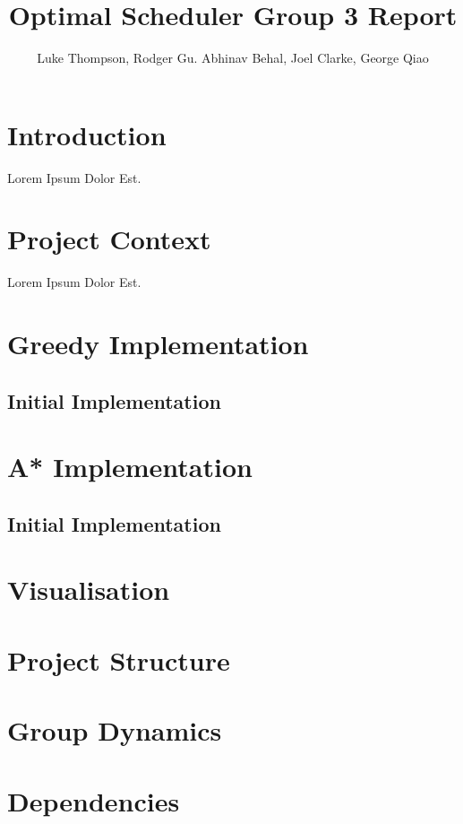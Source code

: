 \documentclass{report}
\begin{document}
\title{Optimal Scheduler Group 3 Report}
\author{Luke Thompson, Rodger Gu. Abhinav Behal, Joel Clarke, George Qiao}

\maketitle


\tableofcontents{}

\pagebreak

\section{Introduction}

\begin{flushleft}
Lorem Ipsum Dolor Est.
\end{flushleft}

\section{Project Context}

\begin{flushleft}
Lorem Ipsum Dolor Est.
\end{flushleft}

\section{Greedy Implementation}

\subsection{Initial Implementation}

\section{A* Implementation}

\subsection{Initial Implementation}

\section{Visualisation}

\section{Project Structure}

\section{Group Dynamics}

\section{Dependencies}
\end{document}
